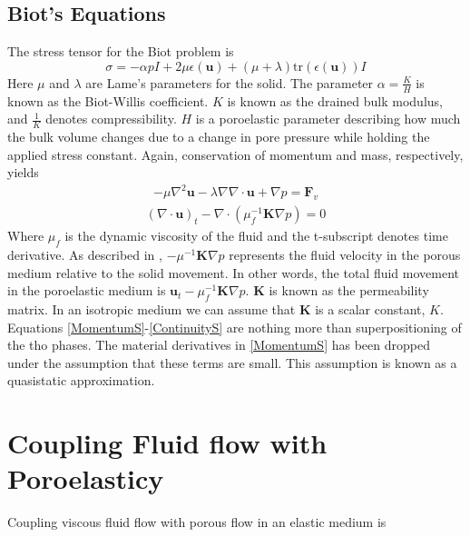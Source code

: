 \subsection{Biot's Equations}
The stress tensor for the Biot problem is 
\[ \sigma = -\alpha pI + 2\mu \epsilon(\mathbf{u}) + (\mu + \lambda)\text{tr}(\epsilon(\mathbf{u}))I  \]
Here $\mu$ and $\lambda$ are Lame's parameters for the solid. The parameter $\alpha = \frac{K}{H}$ is known as the Biot-Willis coefficient. $K$ is known as the drained bulk modulus, and $\frac{1}{K}$ denotes compressibility. $H$ is a poroelastic parameter describing how much the bulk volume changes due to a change in pore pressure while holding the applied stress constant. Again, conservation of momentum and mass, respectively, yields
\begin{align}
	 - \mu \nabla ^2 \mathbf{u}
	 - \lambda \nabla \nabla \cdot \mathbf{u}
	 + \nabla p = \mathbf{F}_v \label{MomentumS}
\end{align}
\begin{align}
	 (\nabla \cdot \mathbf{u})_t
	 - \nabla \cdot (\mu_f^{-1} \mathbf{K} \nabla p) 
	 = 0 \label{ContinuityS}
\end{align}
Where $\mu_f$ is the dynamic viscosity of the fluid and the t-subscript denotes time derivative. As described in \cite{PorousMedia}, $-\mu^{-1}\mathbf{K} \nabla p$ represents the fluid velocity in the porous medium relative to the solid movement. In other words, the total fluid movement in the poroelastic medium is $\mathbf{u}_t - \mu_f^{-1}\mathbf{K} \nabla p$. $\mathbf{K}$ is known as the permeability matrix. In an isotropic medium we can assume that $\mathbf{K}$ is a scalar constant, $K$.
\\
Equations \eqref{MomentumS}-\eqref{ContinuityS} are nothing more than superpositioning of the tho phases. The material derivatives in \eqref{MomentumS} has been dropped under the assumption that these terms are small. This assumption is known as a quasistatic approximation. 
\\

\section{Coupling Fluid flow with Poroelasticy}
Coupling viscous fluid flow with porous flow in an elastic medium is \cite{Riviere2005}
	
